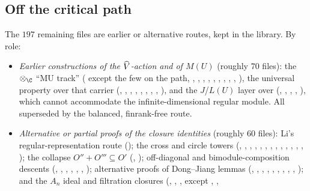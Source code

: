 \subsection{Off the critical path}

The $197$ remaining files are earlier or alternative routes, kept in the library. By role:
\begin{itemize}
\item \emph{Earlier constructions of the $\widehat{V}$-action and of $M(U)$} (roughly $70$ files): the $\otimes_\C$ ``MU track''
  ( except the few on the path, , , ,
  , , , , ,
  , ), the universal property over that carrier (,
  , , , , ,
  , , ), and the $J$/$L(U)$ layer over 
  (, , , , ), which cannot
  accommodate the infinite-dimensional regular module. All superseded by the balanced, finrank-free  route.
\item \emph{Alternative or partial proofs of the closure identities} (roughly $60$ files): Li's regular-representation route
  (); the cross and circle towers (, , , ,
  , , , , , ,
  , , , ); the collapse
  $O''+O'''\subseteq O'$ (, ); off-diagonal and bimodule-composition descents
  (, , , , ,
  , ); alternative proofs of Dong--Jiang lemmas (, ,
  , , , , ,
  , , ); and the $A_n$ ideal and filtration closures
  (, , ,  except , ,

\end{itemize}
